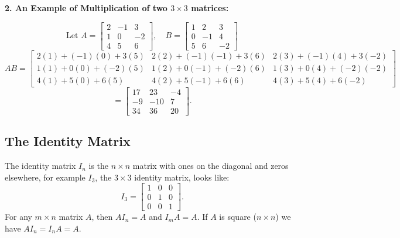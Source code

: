 \newpage 
\noindent \textbf{2. An Example of Multiplication of two \( 3 \times 3 \) matrices:}

\[
    \text{Let } A = \begin{bmatrix} 2 & -1 & 3 \\ 1 & 0 & -2 \\ 4 & 5 & 6 \end{bmatrix}, \quad
B = \begin{bmatrix} 1 & 2 & 3 \\ 0 & -1 & 4 \\ 5 & 6 & -2 \end{bmatrix}
\]
\[
AB = \begin{bmatrix} 
2(1) + (-1)(0) + 3(5) & 2(2) + (-1)(-1) + 3(6) & 2(3) + (-1)(4) + 3(-2) \\ 
1(1) + 0(0) + (-2)(5) & 1(2) + 0(-1) + (-2)(6) & 1(3) + 0(4) + (-2)(-2) \\ 
4(1) + 5(0) + 6(5) & 4(2) + 5(-1) + 6(6) & 4(3) + 5(4) + 6(-2)
\end{bmatrix}
\]
\[
= \begin{bmatrix} 17 & 23 & -4 \\ -9 & -10 & 7 \\ 34 & 36 & 20 \end{bmatrix}.
\]

\subsection{The Identity Matrix}

The identity matrix \( I_n \) is the \( n \times n \) matrix with ones on the diagonal and zeros elsewhere, for example $I_3$, the $3\times 3$ identity matrix, looks like:
\[
I_3 = \begin{bmatrix} 1 & 0 & 0 \\ 0 & 1 & 0 \\ 0 & 0 & 1 \end{bmatrix}.
\]
For any $m \times n$ matrix \( A \), then \( A I_n = A \) and \( I_m A = A \). If $A$ is square ($n\times n$) we have $AI_n =I_nA = A$.

